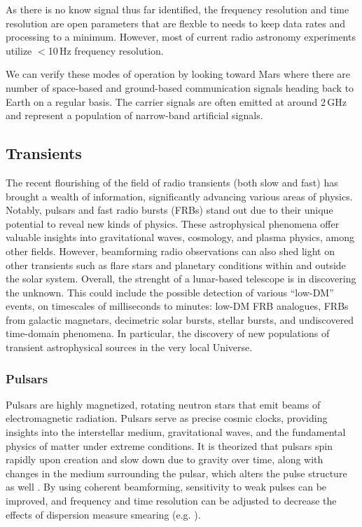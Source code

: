As there is no know signal thus far identified, the frequency resolution and time resolution are open parameters that are flexble to needs to keep data rates and processing to a minimum. However, most of current radio astronomy experiments utilize $<$10\,Hz frequency resolution. 

We can verify these modes of operation by looking toward Mars where there are number of space-based and ground-based communication signals heading back to Earth on a regular basis. The carrier signals are often emitted at around 2\,GHz and represent a population of narrow-band artificial signals.

\subsection{Transients}
The recent flourishing of the field of radio transients (both slow and fast) has brought a wealth of information, significantly advancing various areas of physics. Notably, pulsars and fast radio bursts (FRBs) stand out due to their unique potential to reveal new kinds of physics. These astrophysical phenomena offer valuable insights into gravitational waves, cosmology, and plasma physics, among other fields. However, beamforming radio observations can also shed light on other transients such as flare stars and planetary conditions within and outside the solar system. Overall, the strenght of a lunar-based telescope is in discovering the unknown. This could include the possible detection of various “low-DM” events, on timescales of milliseconds to minutes: low-DM FRB analogues, FRBs from galactic magnetars, decimetric solar bursts, stellar bursts, and undiscovered time-domain phenomena. In particular, the discovery of new populations of transient astrophysical sources in the very local Universe.

\subsubsection{Pulsars}
Pulsars are highly magnetized, rotating neutron stars that emit beams of electromagnetic radiation. Pulsars serve as precise cosmic clocks, providing insights into the interstellar medium, gravitational waves, and the fundamental physics of matter under extreme conditions. It is theorized that pulsars spin rapidly upon creation and slow down due to gravity over time, along with changes in the medium surrounding the pulsar, which alters the pulse structure as well \citep{LW_2013}. By using coherent beamforming, sensitivity to weak pulses can be improved, and frequency and time resolution can be adjusted to decrease the effects of dispersion measure smearing (e.g. \cite{WL_2020}).\\


